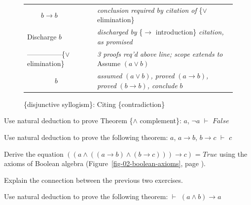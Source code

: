 {{\begin{figure}
\begin{center}
\begin{tabular}{ll}
~~~~$b \rightarrow b$ &\emph{conclusion required by citation of} \{$\vee$ elimination\}\\
Discharge $b$              & \emph{discharged by} \{$\rightarrow$ introduction\} \emph{citation, as promised}\\
---------------\{$\vee$ elimination\}       &\emph{3 proofs req'd above line; scope extends to} Assume $(a \vee b)$\\
~~~~~~~~$b$        &\emph{assumed} $(a \vee b)$\emph{, proved} $(a \rightarrow b)$\emph{, proved} $(b \rightarrow b)$\emph{, conclude }$b$\\
\end{tabular}
\end{center}
\caption{\{disjunctive syllogism\}: Citing \{contradiction\}}
\label{fig:disjunctive-syllogism-nd}
\end{figure}

\begin{ExerciseList}

\Exercise
\label{thm:and-complement}
Use natural deduction to prove
Theorem
\{$\wedge$ complement\}: $a$, $\neg a$ $\vdash$ $False$

\Exercise
Use natural deduction to prove the following theorem:
$a$, $a \rightarrow b$, $b \rightarrow c$ $\vdash$ $c$

\Exercise
Derive the equation
$((a \wedge ((a \rightarrow b) \wedge (b \rightarrow c))) \rightarrow c)$ = $True$
using the axioms of Boolean algebra
(Figure~\ref{fig-02-boolean-axioms}, page \pageref{fig-02-boolean-axioms}).

\Exercise
Explain the connection between the previous two exercises.

\Exercise
Use natural deduction to prove the following theorem:
$\vdash$ $(a \wedge b) \rightarrow a$


\end{ExerciseList}}}
